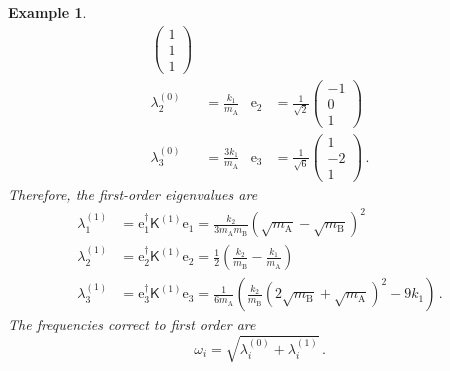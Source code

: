 \documentclass{article}
\theoremstyle{plain}\theoremheaderfont{\normalfont\itshape}\theorembodyfont{\rmfamily}\theoremseparator{.}\newtheorem*{rem}{Remark}\newtheorem*{ex}{Example}\newtheorem*{proof}{Proof}\newtheorem*{altp}{Alternative proof}
\theoremstyle{plain}\theoremheaderfont{\normalfont\bfseries}\theorembodyfont{\rmfamily}\theoremseparator{.}\newtheorem{thm}{Theorem}[section]\newtheorem{lem}[thm]{Lemma}\newtheorem{prop}[thm]{Proposition}\newtheorem*{cor}{Corollary}\newtheorem{defn}[thm]{Definition}\newtheorem{clm}[thm]{Claim}\newtheorem{clminproof}{Claim}
\theoremstyle{break}\theoremheaderfont{\normalfont\itshape}\theorembodyfont{\rmfamily}\theoremseparator{.\medskip}\newtheorem*{proofskip}{Proof}\newtheorem*{exs}{Examples}\newtheorem*{rems}{Remarks}
\theoremstyle{break}\theoremheaderfont{\normalfont\bfseries}\theorembodyfont{\rmfamily}\theoremseparator{.\medskip}\newtheorem{lemskip}[thm]{Lemma}\newtheorem{defnskip}[thm]{Definition}\newtheorem{propskip}[thm]{Proposition}\newtheorem{thmskip}[thm]{Theorem}
\numberwithin{equation}{section}
\newcommand{\vb}[1]{\bm{\mathrm{#1}}}
\renewcommand{\AA}{\mathrm{A}}
\newcommand{\BB}{\mathrm{B}}
\begin{document}
\begin{ex}
\begin{align}
\begin{pmatrix}
                1 \\ 1 \\ 1
            \end{pmatrix} \\
            \lambda_2^{(0)}&=\frac{k_1}{m_{\AA}} & \vb{e}_2&=\frac{1}{\sqrt{2}}\begin{pmatrix}
                -1 \\ 0 \\ 1
            \end{pmatrix} \\
            \lambda_3^{(0)}&=\frac{3k_1}{m_{\AA}} & \vb{e}_3&=\frac{1}{\sqrt{6}}\begin{pmatrix}
                1 \\ -2 \\ 1
            \end{pmatrix}\,.
        \end{align}
        Therefore, the first-order eigenvalues are
        \begin{align}
            \lambda_1^{(1)}&=\vb{e}_1^\dagger\mathsf{K}^{(1)}\vb{e}_1=\frac{k_2}{3m_{\AA}m_{\BB}}(\sqrt{m_{\AA}}-\sqrt{m_{\BB}})^2 \\
            \lambda_2^{(1)}&=\vb{e}_2^\dagger\mathsf{K}^{(1)}\vb{e}_2=\frac{1}{2}\left(\frac{k_2}{m_{\BB}}-\frac{k_1}{m_{\AA}}\right) \\
            \lambda_3^{(1)}&=\vb{e}_3^\dagger\mathsf{K}^{(1)}\vb{e}_3=\frac{1}{6m_{\AA}}\left(\frac{k_2}{m_{\BB}}(2\sqrt{m_{\BB}}+\sqrt{m_{\AA}})^2-9k_1\right)\,.
        \end{align}
        The frequencies correct to first order are
        \begin{equation}
            \omega_i=\sqrt{\lambda_i^{(0)}+\lambda_i^{(1)}}\,.
        \end{equation}
    \end{ex}
\end{document}
